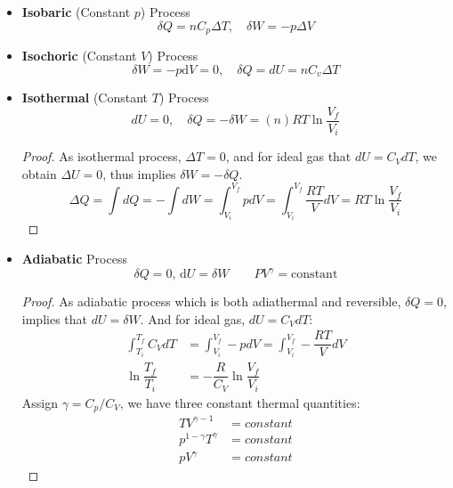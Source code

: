 \documentclass[UTF8]{book}
\begin{document}
\begin{itemize}
\item  {\textbf{Isobaric} (Constant $p$) Process}
$$\delta Q=nC_p\Delta T, \quad \delta W=-p\Delta V $$
\item  {\textbf{Isochoric} (Constant $V$) Process}
$$\delta W=-p \mathrm{d}V=0, \quad \delta Q=dU=nC_v\Delta T$$
\item  {\textbf{Isothermal} (Constant $T$) Process}
$$dU=0,\quad \delta Q=-\delta W=(n)RT\ln \dfrac{V_f}{V_i}$$
\begin{proof}
 {As isothermal process, $\Delta T=0$, and for ideal gas that $dU=C_VdT$, we obtain $\Delta U=0$, thus implies $\delta W=-\delta Q$.}
$$\Delta Q = \int dQ =-\int dW=\int_{V_i}^{V_f}p d V=\int_{V_i}^{V_f}\dfrac{RT}{V}dV=RT\ln \dfrac{V_f}{V_i}$$
\end{proof}
\item  {\textbf{Adiabatic} Process}
$$\delta Q=0, \,  \mathrm{d} U= \delta W  \qquad PV^{\gamma}=\mathrm{constant}$$
\begin{proof}
 {As adiabatic process which is both adiathermal and reversible, $\delta Q=0$, implies that $dU=\delta W$. And for ideal gas, $dU=C_VdT$:}
\begin{align*}
\int_{T_i}^{T_f}C_VdT&=\int_{V_i}^{V_f}-pdV=\int_{V_i}^{V_f}-\dfrac{RT}{V}dV\\
\ln \dfrac{T_f}{T_i}&=-\dfrac{R}{C_V}\ln \dfrac{V_f}{V_i}
\end{align*}
 {Assign $\gamma=C_p/C_V$, we have three constant thermal quantities:}
\begin{align*}
TV^{\gamma -1}&= {constant}\\
p^{1-\gamma}T^{\gamma}&= {constant}\\
pV^{\gamma}&= {constant}
\end{align*}
\end{proof}
\end{itemize}
\end{document}
